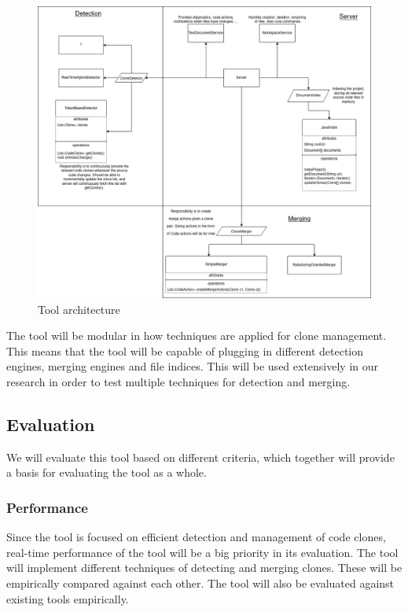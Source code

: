 \documentclass[12pt]{article}
\begin{document}
\begin{figure}
    \includegraphics[width=\textwidth]{images/ToolArchitecture.png}
    \caption{Tool architecture}
    \label{fig:architecture}
\end{figure}

The tool will be modular in how techniques are applied for clone management. This
means that the tool will be capable of plugging in different detection engines, merging
engines and file indices. This will be used extensively in our research in order to test
multiple techniques for detection and merging. 

\subsection{Evaluation}

We will evaluate this tool based on different criteria, which together will provide a
basis for evaluating the tool as a whole.

\subsubsection{Performance}

Since the tool is focused on efficient detection and management of code clones, real-time
performance of the tool will be a big priority in its evaluation. The tool will implement
different techniques of detecting and merging clones. These will be empirically compared
against each other. The tool will also be evaluated against existing tools empirically.
\end{document}

